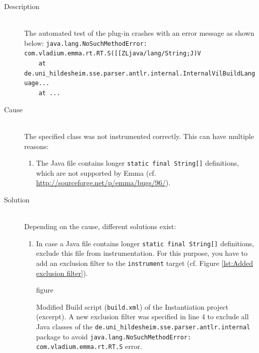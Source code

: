 \begin{description}
	\item[Description] $ $\\
		The automated test of the plug-in crashes with an error message as shown below:
		\small
			\verb|java.lang.NoSuchMethodError: |\color{red}\verb|com.vladium.emma.rt.RT.S([[ZLjava/lang/String;J)V|\\
			\color{black}\verb|    at de.uni_hildesheim.sse.parser.antlr.internal.InternalVilBuildLanguage...|\\
			\verb|    at ...|
		\normalsize
	\item[Cause] $ $\\
	The specified class was not instrumented correctly. This can have multiple reasons:
	\begin{enumerate}
		\item The Java file contains longer \texttt{static final String[]} definitions, which are not supported by Emma (cf. \url{http://sourceforge.net/p/emma/bugs/96/}).
	\end{enumerate}
	\item[Solution] $ $\\
	Depending on the cause, different solutions exist:	
	\begin{enumerate}
		\item In case a Java file contains longer \texttt{static final String[]} definitions, exclude this file from instrumentation. For this purpose, you have to add an exclusion filter to the \texttt{instrument} target (cf. Figure \vref{lst:Added exclusion filter}).
		\begin{nofloat}{figure}
			\centering
			
			\caption[Added exclusion filter to solve a com.vladium.emma.rt.RT.S error]{Modified Build script (\texttt{build.xml}) of the Instantiation project (excerpt). A new exclusion filter was specified in line 4 to exclude all Java classes of the \texttt{de.uni\_hildesheim.sse.parser.antlr.internal} package to avoid \texttt{java.lang.NoSuchMethodError: com.vladium.emma.rt.RT.S} error.}
			\label{lst:Added exclusion filter}
\end{nofloat}
	\end{enumerate}
\end{description}
\newpage
